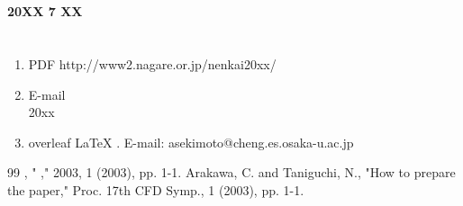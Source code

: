 \documentclass{article}
\begin{document}
\section{ }

 {\bfseries 20XX 7 XX } 


\section{ }
\begin{enumerate}
 \item[(1)]  PDF http://www2.nagare.or.jp/nenkai20xx/  
 \item[(2)]  E-mail \\ 20xx \\  
 \item[(3)]  overleaf LaTeX . E-mail: asekimoto@cheng.es.osaka-u.ac.jp 
\end{enumerate}

\begin{thebibliography}{99}
  , " ,"  2003, 1 (2003), pp. 1-1.
 Arakawa, C. and Taniguchi, N., "How to prepare the paper," Proc. 17th CFD Symp., 1 (2003), pp. 1-1.
\end{thebibliography}
\end{document}
